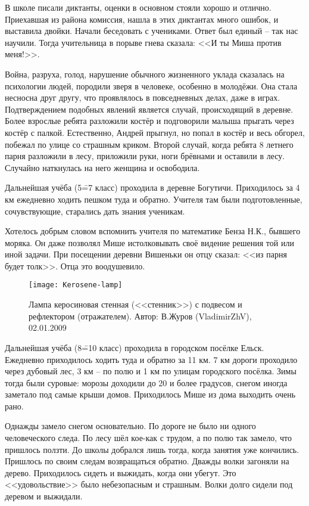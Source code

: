 В школе писали диктанты, оценки в основном стояли хорошо и отлично. Приехавшая из района комиссия, нашла в этих диктантах много ошибок, и выставила двойки. Начали беседовать с учениками. Ответ был единый \--- так нас научили. Тогда учительница в порыве гнева сказала: <<И ты Миша против меня!>>.

Война, разруха, голод, нарушение обычного жизненного уклада сказалась на психологии людей, породили зверя в человеке, особенно в молодёжи. Она стала несносна друг другу, что проявлялось в повседневных делах, даже в играх. Подтверждением подобных явлений является случай, происходящий в деревне. Более взрослые ребята разложили костёр и подговорили малыша прыгать через костёр с палкой. Естественно, Андрей прыгнул, но попал в костёр и весь обгорел, побежал по улице со страшным криком. Второй случай, когда ребята 8 летнего парня разложили в лесу, приложили руки, ноги брёвнами и оставили в лесу. Случайно наткнулась на него женщина и освободила.

Дальнейшая учёба (5\==7 класс) проходила в деревне Богутичи. Приходилось за 4 км ежедневно ходить пешком туда и обратно. Учителя там были подготовленные, сочувствующие, старались дать знания ученикам. 

Хотелось добрым словом вспомнить учителя по математике Бенза Н.К., бывшего моряка. Он даже позволял Мише истолковывать своё видение решения той или иной задачи. При посещении деревни Вишеньки он отцу сказал: <<из парня будет толк>>. Отца это воодушевило.

\begin{wrapfigure}{O}{.2\textwidth}
\centering
\texttt{[image: Kerosene-lamp]}
\caption{Лампа керосиновая стенная (<<стенник>>) с подвесом и рефлектором (отражателем). Автор: В.Журов (VladimirZhV), 02.01.2009}
\label{fig:Kerosene-lamp}
\end{wrapfigure}

Дальнейшая учёба (8\==10 класс) проходила в городском посёлке Ельск. Ежедневно приходилось ходить туда и обратно за 11 км. 7 км дороги проходило через дубовый лес, 3 км \--- по полю и 1 км по улицам городского посёлка. Зимы тогда были суровые: морозы доходили до 20 и более градусов, снегом иногда заметало под самые крыши домов. Приходилось Мише из дома выходить очень рано. 

Однажды замело снегом основательно. По дороге не было ни одного человеческого следа. По лесу шёл кое-как с трудом, а по полю так замело, что пришлось ползти. До школы добрался лишь тогда, когда занятия уже кончились. Пришлось по своим следам возвращаться обратно. Дважды волки загоняли на дерево. Приходилось сидеть и выжидать, когда они убегут. Это <<удовольствие>> было небезопасным и страшным. Волки долго сидели под деревом и выжидали.

